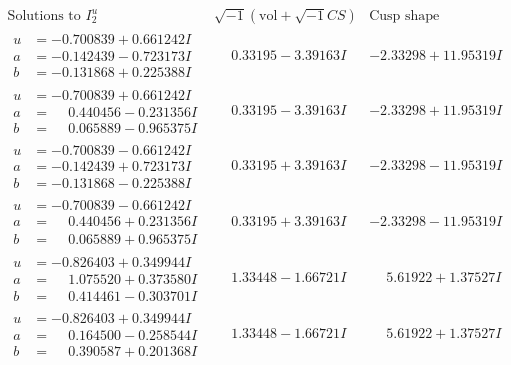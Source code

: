 \documentclass[1p]{elsarticle_modified}
\theoremstyle{definition}
\newcommand{\I}{\sqrt{-1}}
\begin{document}
$$\begin{array}{c|c|c}  
\text{Solutions to }I^u_{2}& \I (\text{vol} + \sqrt{-1}CS) & \text{Cusp shape}\\
 \hline 
\begin{aligned}
u &= -0.700839 + 0.661242 I \\
a &= -0.142439 - 0.723173 I \\
b &= -0.131868 + 0.225388 I\end{aligned}
 & \phantom{-}0.33195 - 3.39163 I & -2.33298 + 11.95319 I \\ \hline\begin{aligned}
u &= -0.700839 + 0.661242 I \\
a &= \phantom{-}0.440456 - 0.231356 I \\
b &= \phantom{-}0.065889 - 0.965375 I\end{aligned}
 & \phantom{-}0.33195 - 3.39163 I & -2.33298 + 11.95319 I \\ \hline\begin{aligned}
u &= -0.700839 - 0.661242 I \\
a &= -0.142439 + 0.723173 I \\
b &= -0.131868 - 0.225388 I\end{aligned}
 & \phantom{-}0.33195 + 3.39163 I & -2.33298 - 11.95319 I \\ \hline\begin{aligned}
u &= -0.700839 - 0.661242 I \\
a &= \phantom{-}0.440456 + 0.231356 I \\
b &= \phantom{-}0.065889 + 0.965375 I\end{aligned}
 & \phantom{-}0.33195 + 3.39163 I & -2.33298 - 11.95319 I \\ \hline\begin{aligned}
u &= -0.826403 + 0.349944 I \\
a &= \phantom{-}1.075520 + 0.373580 I \\
b &= \phantom{-}0.414461 - 0.303701 I\end{aligned}
 & \phantom{-}1.33448 - 1.66721 I & \phantom{-}5.61922 + 1.37527 I \\ \hline\begin{aligned}
u &= -0.826403 + 0.349944 I \\
a &= \phantom{-}0.164500 - 0.258544 I \\
b &= \phantom{-}0.390587 + 0.201368 I\end{aligned}
 & \phantom{-}1.33448 - 1.66721 I & \phantom{-}5.61922 + 1.37527 I \\ \hline\begin{aligned}

\end{aligned}
\end{array}$$
\end{document}
